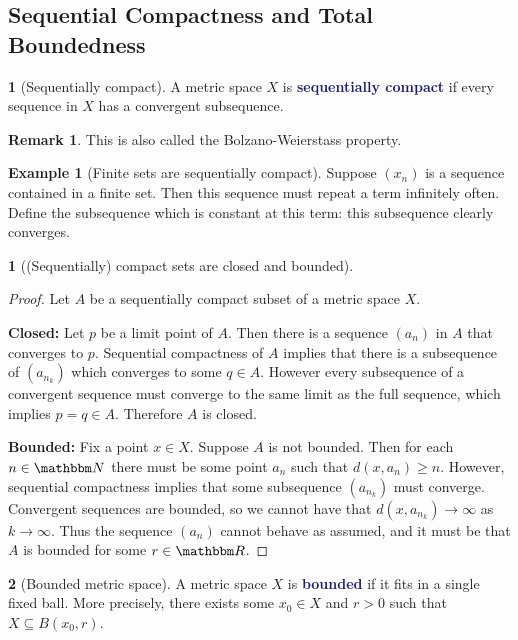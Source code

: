 \documentclass[12pt]{article}
\numberwithin{equation}{section}
\newcommand{\navy}[1]{\textcolor{MidnightBlue}{\bf #1}}
\theoremstyle{plain}
\newtheorem{theorem}{\color{ForestGreen}{\textbf{Theorem}}}[section]
\theoremstyle{definition}
\newtheorem{definition}{\color{MidnightBlue}{\textbf{Definition}}}[section]
\newtheorem{example}{\color{WildStrawberry}Example}[section]
\newtheorem*{remark}{Remark}
\newcommand{\1}{\mathbbm 1}
\newcommand{\RR}{\mathbbm R}
\newcommand{\NN}{\mathbbm N}
\begin{document}
\subsection{Sequential Compactness and Total Boundedness}

\begin{definition}[Sequentially compact]
	A metric space $X$ is \navy{sequentially compact} if every sequence in $X$ has a convergent subsequence. 
	\begin{remark}
	This is also called the Bolzano-Weierstass property. 
	\end{remark}	
\end{definition}

\begin{example}[Finite sets are sequentially compact]
	Suppose $(x_n)$ is a sequence contained in a finite set. Then this sequence must repeat a term infinitely often. Define the subsequence which is constant at this term: this subsequence clearly converges. 
\end{example}

\begin{theorem}[(Sequentially) compact sets are closed and bounded]
\end{theorem}
\begin{proof}
	Let $A$ be a sequentially compact subset of a metric space $X$.

	\textbf{Closed:} Let $p$ be a limit point of $A$. Then there is a sequence $(a_n)$ in $A$ that converges to $p$. Sequential compactness of $A$ implies that there is a subsequence of $(a_{n_k})$ which converges to some $q \in A$. However every subsequence of a convergent sequence must converge to the same limit as the full sequence, which implies $p=q \in A$. Therefore $A$ is closed. 

	\textbf{Bounded:} Fix a point $x \in X$. Suppose $A$ is not bounded. Then for each $n \in \NN$ there must be some point $a_n$ such that $d(x,a_n) \geq n$. However, sequential compactness implies that some subsequence $(a_{n_k})$ must converge. Convergent sequences are bounded, so we cannot have that $d(x,a_{n_k}) \to \infty$ as $k \to \infty$. Thus the sequence $(a_n)$ cannot behave as assumed, and it must be that $A$ is bounded for some $r \in \RR$. 

\end{proof}


\begin{definition}[Bounded metric space]
	A metric space $X$ is \navy{bounded} if it fits in a single fixed ball. More precisely, there exists some $x_0 \in X$ and $r > 0$ such that $X \subseteq B(x_0,r)$. 
\end{definition}
\end{document}
